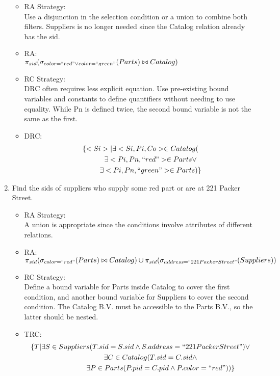 \documentclass[12pt]{article}
\begin{document}
\begin{enumerate}
\begin{itemize}
\item RA Strategy: \\
Use a disjunction in the selection condition or a union to combine both filters. Suppliers is no longer needed since the Catalog relation already has the sid. 
\item RA: \\
$\pi_{sid}(\sigma_{color=``red" \vee color=``green"}(Parts) \bowtie Catalog)$
\item RC Strategy: \\
DRC often requires less explicit equation. Use pre-existing bound variables and constants to define quantifiers without needing to use equality. While Pn is defined twice, the second bound variable is not the same as the first.
\item DRC:
\begin{multline*}
\{<Si>|\exists<Si,Pi,Co> \in Catalog( \\
	\hspace{1cm}\exists <Pi,Pn,``red"> \in Parts \vee \\
	\hspace{1cm}\exists <Pi,Pn,``green"> \in Parts)\} \\
\end{multline*}
\end{itemize}

	\item Find the sids of suppliers who supply some red part or are at 221 Packer Street. 

\begin{itemize}
\item RA Strategy: \\
A union is appropriate since the conditions involve attributes of different relations.
\item RA: \\
$\pi_{sid}(\sigma_{color=``red"}(Parts) \bowtie Catalog)\cup\pi_{sid}(\sigma_{address=``221 Packer Street"}(Suppliers))$
\item RC Strategy: \\
Define a bound variable for Parts inside Catalog to cover the first condition, and another bound variable for Suppliers to cover the second condition. The Catalog B.V. must be accessible to the Parts B.V., so the latter should be nested.
\item TRC:
\begin{multline*}
\{T|\exists S \in Suppliers(T.sid = S.sid \wedge 
		S.address=``221 Packer Street") \vee \\
	\hspace{1cm}\exists C \in Catalog(T.sid = C.sid \wedge \\
	\hspace{2cm}\exists P \in Parts(P.pid = C.pid \wedge P.color=``red"))\} \\
\end{multline*}
\end{itemize}
	

\end{enumerate}
\end{document}
